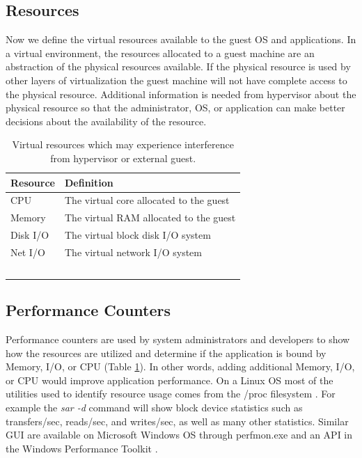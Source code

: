 \subsection{Resources}
Now we define the virtual resources available to the guest OS and applications.
In a virtual environment, the resources allocated to a guest machine are an abstraction of the physical resources available.  
If the physical resource is used by other layers of virtualization the guest machine will not have complete access to the physical resource.    
Additional information is needed from hypervisor about the physical resource so that the administrator, OS, or application can make better decisions about the availability of the resource. 

\begin{table}[h]
  \begin{tabular}{ l p{10cm} }
    Resource & Definition \\
    \hline
    CPU & The virtual core allocated to the guest \\
    Memory & The virtual RAM allocated to the guest \\
    Disk I/O & The virtual block disk I/O system \\
    Net I/O & The virtual network I/O system \\
    \hline
  \end{tabular}
\caption{Virtual resources which may experience interference from hypervisor or external guest.}
\label{tab:resources}
\end{table}

\subsection{Performance Counters}
Performance counters are used by system administrators and developers to show how the resources are utilized and determine if the application is bound by Memory, I/O, or CPU (Table \ref{tab:resources}).  
In other words, adding additional Memory, I/O, or CPU would improve application performance. 
On a Linux OS most of the utilities used to identify resource usage comes from the /proc filesystem \cite{proc}. 
For example the \emph{sar -d} command will show block device statistics such as transfers/sec, reads/sec, and writes/sec, as well as many other statistics.  
Similar GUI are available on Microsoft Windows OS through perfmon.exe and an API in the Windows Performance Toolkit \cite{winperf}. 

